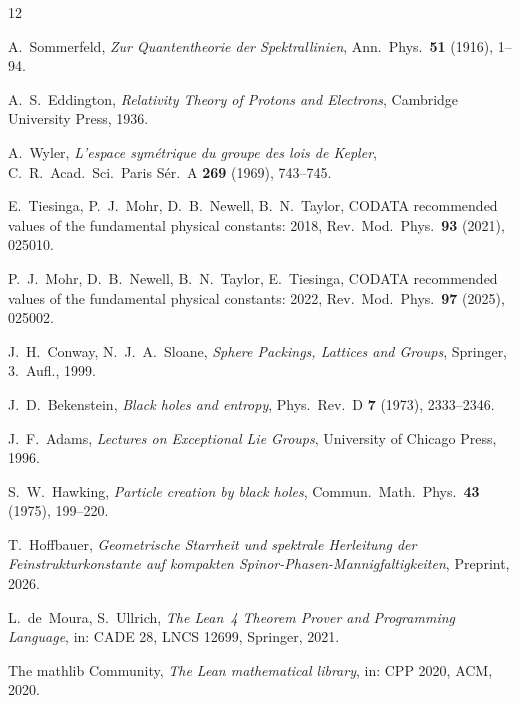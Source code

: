 \documentclass[11pt,a4paper]{article}
\begin{document}
{\footnotesize
\setlength{\itemsep}{0.12em}
\begin{thebibliography}{12}

A.~Sommerfeld,
\emph{Zur Quantentheorie der Spektrallinien},
Ann.\ Phys.\ \textbf{51} (1916), 1--94.

A.~S.~Eddington,
\emph{Relativity Theory of Protons and Electrons},
Cambridge University Press, 1936.

A.~Wyler,
\emph{L'espace symétrique du groupe des lois de Kepler},
C.\ R.\ Acad.\ Sci.\ Paris Sér.\ A \textbf{269} (1969), 743--745.

E.~Tiesinga, P.~J.~Mohr, D.~B.~Newell, B.~N.~Taylor,
CODATA recommended values of the fundamental physical constants: 2018,
Rev.\ Mod.\ Phys.\ \textbf{93} (2021), 025010.

P.~J.~Mohr, D.~B.~Newell, B.~N.~Taylor, E.~Tiesinga,
CODATA recommended values of the fundamental physical constants: 2022,
Rev.\ Mod.\ Phys.\ \textbf{97} (2025), 025002.

J.~H.~Conway, N.~J.~A.~Sloane,
\emph{Sphere Packings, Lattices and Groups},
Springer, 3.\ Aufl., 1999.

J.~D.~Bekenstein,
\emph{Black holes and entropy},
Phys.\ Rev.\ D \textbf{7} (1973), 2333--2346.

J.~F.~Adams,
\emph{Lectures on Exceptional Lie Groups},
University of Chicago Press, 1996.

S.~W.~Hawking,
\emph{Particle creation by black holes},
Commun.\ Math.\ Phys.\ \textbf{43} (1975), 199--220.

T.~Hoffbauer,
\emph{Geometrische Starrheit und spektrale Herleitung der Feinstrukturkonstante auf kompakten Spinor-Phasen-Mannigfaltigkeiten},
Preprint, 2026.

L.~de~Moura, S.~Ullrich,
\emph{The Lean~4 Theorem Prover and Programming Language},
in: CADE 28, LNCS 12699, Springer, 2021.

The mathlib Community,
\emph{The Lean mathematical library},
in: CPP 2020, ACM, 2020.

\end{thebibliography}
}
\end{document}
